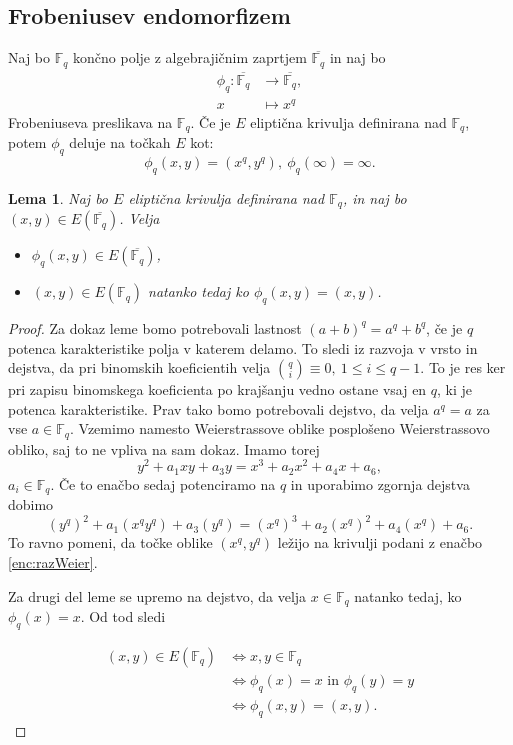 \documentclass[12pt,a4paper,twoside]{article}
\theoremstyle{definition} %
\theoremstyle{plain} %
\newtheorem{lema}[definicija]{Lema}
\numberwithin{equation}{section}  %
\newcommand{\F}{\mathbb F}
\newcommand{\E}[1]{E({#1})}
\begin{document}
\subsection{Frobeniusev endomorfizem}

Naj bo $\F_q$ končno polje z algebrajičnim zaprtjem $\overline{\F_q}$ in naj bo
\begin{align}
\phi_q:\overline{\F_q} &{} \rightarrow \overline{\F_q}, \nonumber \\
x &{} \mapsto x^q \nonumber
\end{align}
Frobeniuseva preslikava na $\F_q$.
Če je $E$ eliptična krivulja definirana nad $\F_q$, potem $\phi_q$ deluje na točkah $E$ kot:
$$\phi_q(x,y) = (x^q,y^q), \ \phi_q(\infty) = \infty.$$

\begin{lema}

Naj bo $E$ eliptična krivulja definirana nad $\F_q$, in naj bo $(x,y) \in \E{\overline{\F_q}}$. Velja
\begin{itemize}

\item $\phi_q(x,y) \in \E{\overline{\F_q}}$,
\item $(x,y) \in \E{\F_q}$ natanko tedaj ko $\phi_q(x,y) = (x,y)$.


\end{itemize}

\end{lema}

\begin{proof}

Za dokaz leme bomo potrebovali lastnost $(a+b)^q = a^q+b^q$, če je $q$ potenca karakteristike polja v katerem delamo. To sledi iz razvoja v vrsto in dejstva, da pri binomskih koeficientih velja
${q\choose i} \equiv 0,\  1 \leq i \leq q-1$. To je res ker pri zapisu binomskega koeficienta po krajšanju vedno ostane vsaj en $q$, ki je potenca karakteristike. Prav tako bomo potrebovali dejstvo, da velja $a^q = a$ za vse $a \in \F_q$. 
Vzemimo namesto Weierstrassove oblike posplošeno Weierstrassovo obliko, saj to ne vpliva na sam dokaz. Imamo torej
\begin{equation}
\label{enc:razWeier}
y^2+a_1xy+a_3y=x^3+a_2x^2+a_4x+a_6,
\end{equation}
$a_i \in \F_q$. Če to enačbo sedaj potenciramo na $q$ in uporabimo zgornja dejstva dobimo
$$(y^q)^2+a_1(x^qy^q)+a_3(y^q)=(x^q)^3+a_2(x^q)^2+a_4(x^q)+a_6.$$
To ravno pomeni, da točke oblike $(x^q,y^q)$ ležijo na krivulji podani z enačbo \ref{enc:razWeier}.

Za drugi del leme se upremo na dejstvo, da velja $x \in \F_q$ natanko tedaj, ko $\phi_q(x) = x$.
Od tod sledi

\begin{align}
(x,y) \in E(\F_q) &{}\Leftrightarrow x,y \in \F_q \nonumber \\
&{}  \Leftrightarrow \phi_q(x) = x \text{ in } \phi_q(y) = y  \nonumber \\
&{} \Leftrightarrow \phi_q(x,y) = (x,y). \nonumber
\end{align} 

\end{proof}
\end{document}
